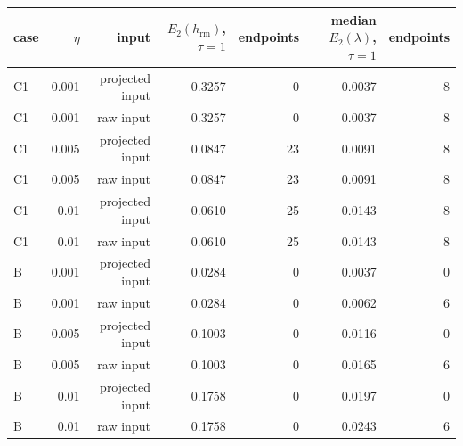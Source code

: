 \begin{tabular}{lrrrrrr}
\toprule
case & $\eta$ & input & $E_2(h_{\mathrm{rm}})$, $\tau=1$ & endpoints & median $E_2(\lambda)$, $\tau=1$ & endpoints  \\
\midrule
C1 & 0.001 & projected input & 0.3257 & 0 & 0.0037 & 8 \\
C1 & 0.001 & raw input & 0.3257 & 0 & 0.0037 & 8 \\
C1 & 0.005 & projected input & 0.0847 & 23 & 0.0091 & 8 \\
C1 & 0.005 & raw input & 0.0847 & 23 & 0.0091 & 8 \\
C1 & 0.01 & projected input & 0.0610 & 25 & 0.0143 & 8 \\
C1 & 0.01 & raw input & 0.0610 & 25 & 0.0143 & 8 \\
B & 0.001 & projected input & 0.0284 & 0 & 0.0037 & 0 \\
B & 0.001 & raw input & 0.0284 & 0 & 0.0062 & 6 \\
B & 0.005 & projected input & 0.1003 & 0 & 0.0116 & 0 \\
B & 0.005 & raw input & 0.1003 & 0 & 0.0165 & 6 \\
B & 0.01 & projected input & 0.1758 & 0 & 0.0197 & 0 \\
B & 0.01 & raw input & 0.1758 & 0 & 0.0243 & 6 \\
\bottomrule
\end{tabular}
